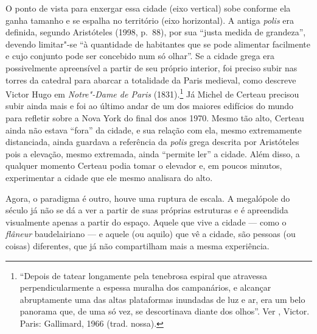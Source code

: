O ponto de vista para enxergar essa cidade (eixo vertical) sobe conforme
ela ganha tamanho e se espalha no território (eixo horizontal). A antiga
\emph{polis} era definida, segundo Aristóteles (1998, p.~88), por sua
``justa medida de grandeza'', devendo limitar"-se ``à quantidade de
habitantes que se pode alimentar facilmente e cujo conjunto pode ser
concebido num só olhar''. Se a cidade grega era possivelmente
apreensível a partir de seu próprio interior, foi preciso subir nas
torres da catedral para abarcar a totalidade da Paris medieval, como
descreve Victor Hugo em \emph{Notre"-Dame de Paris} (1831).\footnote{``Depois
  de tatear longamente pela tenebrosa espiral que atravessa
  perpendicularmente a espessa muralha dos campanários, e alcançar
  abruptamente uma das altas plataformas inundadas de luz e ar, era um
  belo panorama que, de uma só vez, se descortinava diante dos olhos''.
  Ver , Victor. {} Paris: Gallimard, 1966
  (trad. nossa).} Já Michel de Certeau precisou subir ainda mais e foi
ao último andar de um dos maiores edifícios do mundo para refletir sobre
a Nova York do final dos anos 1970. Mesmo tão alto, Certeau ainda não
estava ``fora'' da cidade, e sua relação com ela, mesmo extremamente
distanciada, ainda guardava a referência da \emph{polis} grega descrita
por Aristóteles pois a elevação, mesmo extremada, ainda ``permite ler''
a cidade. Além disso, a qualquer momento Certeau podia tomar o elevador
e, em poucos minutos, experimentar a cidade que ele mesmo analisara do
alto.

Agora, o paradigma é outro, houve uma ruptura de escala. A megalópole do
século  já não se dá a ver a partir de suas próprias estruturas e é
apreendida visualmente apenas a partir do espaço. Aquele que vive a
cidade --- como o \emph{flâneur} baudelairiano --- e aquele (ou aquilo)
que vê a cidade, são pessoas (ou coisas) diferentes, que já não
compartilham mais a mesma experiência.

